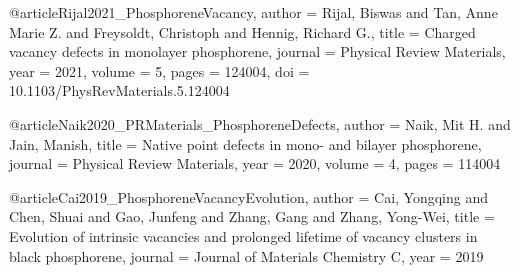 @article{Rijal2021_PhosphoreneVacancy,
  author  = {Rijal, Biswas and Tan, Anne Marie Z. and Freysoldt, Christoph and Hennig, Richard G.},
  title   = {Charged vacancy defects in monolayer phosphorene},
  journal = {Physical Review Materials},
  year    = {2021},
  volume  = {5},
  pages   = {124004},
  doi     = {10.1103/PhysRevMaterials.5.124004}
}

@article{Naik2020_PRMaterials_PhosphoreneDefects,
  author  = {Naik, Mit H. and Jain, Manish},
  title   = {Native point defects in mono- and bilayer phosphorene},
  journal = {Physical Review Materials},
  year    = {2020},
  volume  = {4},
  pages   = {114004}
}

@article{Cai2019_PhosphoreneVacancyEvolution,
  author  = {Cai, Yongqing and Chen, Shuai and Gao, Junfeng and Zhang, Gang and Zhang, Yong-Wei},
  title   = {Evolution of intrinsic vacancies and prolonged lifetime of vacancy clusters in black phosphorene},
  journal = {Journal of Materials Chemistry C},
  year    = {2019}
}

